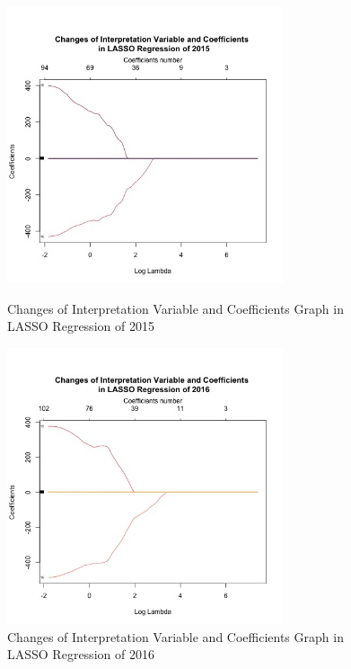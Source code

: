 \documentclass{mcmthesis}
\begin{document}
\begin{appendices}
\begin{figure}[H]
\centering
\begin{minipage}[t]{0.45\textwidth}
\centering
\includegraphics[width=3.2in]{figures/ChangesofInterpretationVariableandCoefficientsinLASSORegressionof2015.jpeg}
\caption{Changes of Interpretation Variable and Coefficients Graph in LASSO Regression of 2015}
\label{Changes of Interpretation Variable and Coefficients Graph in LASSO Regression of 2015}
\end{minipage}
\hfill
\begin{minipage}[t]{0.45\textwidth}
\centering
\includegraphics[width=3.2in]{figures/ChangesofInterpretationVariableandCoefficientsinLASSORegressionof2016.jpeg}
\caption{Changes of Interpretation Variable and Coefficients Graph in LASSO Regression of 2016}
\label{Changes of Interpretation Variable and Coefficients Graph in LASSO Regression of 2016}
\end{minipage}
\end{figure}



\end{appendices}
\end{document}
